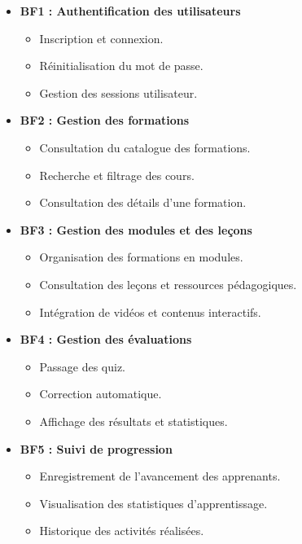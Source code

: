\documentclass[12pt, a4paper]{report}
\begin{document}
\begin{itemize}
    \item \textbf{BF1 : Authentification des utilisateurs}
    \begin{itemize}
        \item Inscription et connexion.
        \item Réinitialisation du mot de passe.
        \item Gestion des sessions utilisateur.
    \end{itemize}

    \item \textbf{BF2 : Gestion des formations}
    \begin{itemize}
        \item Consultation du catalogue des formations.
        \item Recherche et filtrage des cours.
        \item Consultation des détails d'une formation.
    \end{itemize}

    \item \textbf{BF3 : Gestion des modules et des leçons}
    \begin{itemize}
        \item Organisation des formations en modules.
        \item Consultation des leçons et ressources pédagogiques.
        \item Intégration de vidéos et contenus interactifs.
    \end{itemize}

    \item \textbf{BF4 : Gestion des évaluations}
    \begin{itemize}
        \item Passage des quiz.
        \item Correction automatique.
        \item Affichage des résultats et statistiques.
    \end{itemize}

    \item \textbf{BF5 : Suivi de progression}
    \begin{itemize}
        \item Enregistrement de l'avancement des apprenants.
        \item Visualisation des statistiques d'apprentissage.
        \item Historique des activités réalisées.
    \end{itemize}


\end{itemize}
\end{document}
